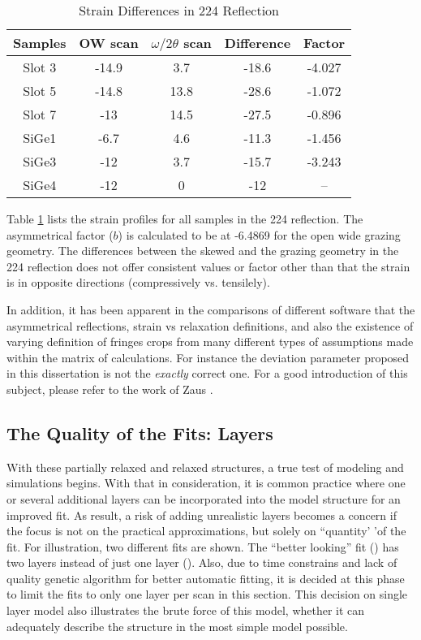 \begin{table}[h]
\centering
\caption{Strain Differences in 224 Reflection}
\label{diff224}
\begin{tabular}{c|cccc}
Samples  & OW scan & $\omega/2\theta$ scan & Difference & Factor\\
\hline
  Slot 3 & -14.9 & 3.7 &-18.6 & -4.027\\
 Slot 5&-14.8&13.8& -28.6 & -1.072\\
Slot 7&-13&14.5 & -27.5 & -0.896\\
SiGe1&-6.7&4.6 & -11.3 & -1.456\\
SiGe3&-12&3.7 & -15.7 & -3.243\\
SiGe4&-12&0 & -12 & --\\
\end{tabular}
\end{table}

Table \ref{diff224} lists the strain profiles for all samples in the 224 reflection.  The asymmetrical factor ($b$) is calculated to be at -6.4869 for the open wide grazing geometry.  The differences between the skewed and the grazing geometry in the 224 reflection does not offer consistent values or factor other than that the strain is in opposite directions (compressively vs. tensilely).


In addition,  it has been apparent in the comparisons of different software that the asymmetrical reflections, strain vs relaxation definitions, and also the existence of varying definition of fringes crops from many different types of assumptions made within the matrix of calculations.  For instance the deviation parameter proposed in this dissertation is not the \emph{exactly} correct one.  For a good introduction of this subject, please refer to the work of Zaus \cite{Zaus1}.

\subsection{The Quality of the Fits: Layers}

With these partially relaxed and relaxed structures, a true test of modeling and simulations begins.  With that in consideration, it is common practice where one or several additional layers can be incorporated into the model structure for an improved fit.  As result, a risk of adding unrealistic layers becomes a concern if the focus is not on the practical approximations, but solely on ``quantity' 'of the fit.   For illustration, two different fits are shown.  The ``better looking'' fit () has two layers instead of just one layer ().  Also, due to time constrains and lack of quality genetic algorithm for better automatic fitting, it is decided at this phase to limit the fits to only one layer per scan in this section.  This decision on single layer model also illustrates the brute force of this model, whether it can adequately describe the structure in the most simple model possible. 

